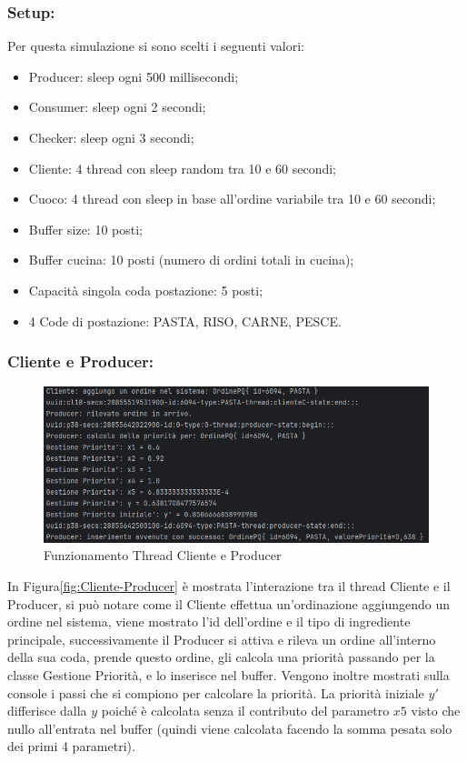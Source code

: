 \subsubsection{Setup:}
Per questa simulazione si sono scelti i seguenti valori:
\begin{itemize}
	\item Producer: sleep ogni 500 millisecondi;
	\item Consumer: sleep ogni 2 secondi;
	\item Checker: sleep ogni 3 secondi;
	\item Cliente: 4 thread con sleep random tra 10 e 60 secondi;
	\item Cuoco: 4 thread con sleep in base all'ordine variabile tra 10 e 60 secondi;
	\item Buffer size: 10 posti;
	\item Buffer cucina: 10 posti (numero di ordini totali in cucina);
	\item Capacità singola coda postazione: 5 posti;
	\item 4 Code di postazione: PASTA, RISO, CARNE, PESCE.
\end{itemize}
\subsubsection{Cliente e Producer:}
\begin{figure}[H]
	\centering
	\includegraphics[scale=0.75]{iterazione3/images/Cliente-Producer.png}
	\caption{Funzionamento Thread Cliente e Producer \label{fig:Cliente-Producer}}
\end{figure}
In Figura\vref{fig:Cliente-Producer} è mostrata l'interazione tra il thread Cliente e il Producer, si può notare come il Cliente effettua un'ordinazione aggiungendo un ordine nel sistema, viene mostrato l'id dell'ordine e il tipo di ingrediente principale, successivamente il Producer si attiva e rileva un ordine all'interno della sua coda, prende questo ordine, gli calcola una priorità passando per la classe Gestione Priorità, e lo inserisce nel buffer. Vengono inoltre mostrati sulla console i passi che si compiono per calcolare la priorità. La priorità iniziale $y'$ differisce dalla $y$ poiché è calcolata senza il contributo del parametro $x5$ visto che nullo all'entrata nel buffer (quindi viene calcolata facendo la somma pesata solo dei primi 4 parametri).
